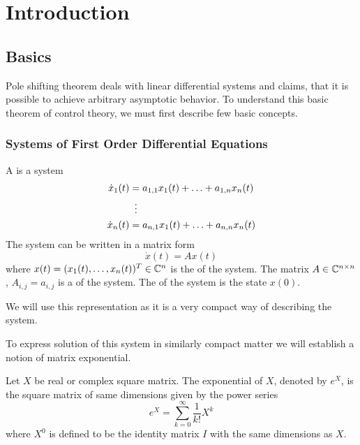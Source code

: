 \chapter{Introduction}
\label{chap:intr}

\section{Basics}
\label{sec:basics}

Pole shifting theorem deals with linear differential systems and claims, that it is possible to achieve arbitrary asymptotic behavior. To understand this basic theorem of control theory, we must first describe few basic concepts.

\subsection{Systems of First Order Differential Equations}

\begin{definition}
	A  is a system 
	\begin{align*}
		\dot{x}_1(t)&=a_{1,1}x_1(t)+\ldots+a_{1,n}x_n(t) \\
		&\vdotswithin{=} \\
		\dot{x}_n(t)&=a_{n,1}x_1(t)+\ldots+a_{n,n}x_n(t) 
	\end{align*}
	The system can be written in a matrix form $$\dot{x}(t)=Ax(t)$$ where $x(t)=(x_1(t),\ldots,x_n(t))^T \in \mathbb{C}^n$ is the  of the system. The matrix $A\in \mathbb{C}^{n\times n}$, $A_{i,j}=a_{i,j}$ is a  of the system. The  of the system is the state $x(0)$.
\end{definition}

We will use this representation as it is a very compact way of describing the system.

To express solution of this system in similarly compact matter we will establish a notion of matrix exponential.

\begin{definition}
	Let $X$ be real or complex square matrix. The exponential of $X$, denoted by $e^X$, is the square matrix of same dimensions given by the power series $$e^{X}=\sum _{k=0}^{\infty}\frac{1}{k!}X^{k}$$
	where $X^0$ is defined to be the identity matrix $I$ with the same dimensions as $X$.
\end{definition}


